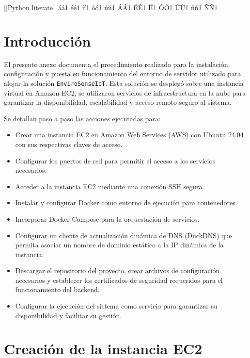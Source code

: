 []{Python}{
literate={á}{{\'a}}1 {é}{{\'e}}1 {í}{{\'i}}1 {ó}{{\'o}}1 {ú}{{\'u}}1
{Á}{{\'A}}1 {É}{{\'E}}1 {Í}{{\'I}}1 {Ó}{{\'O}}1 {Ú}{{\'U}}1
{ñ}{{\~n}}1 {Ñ}{{\~N}}1
}


\section{Introducción}

El presente anexo documenta el procedimiento realizado para la instalación,
configuración y puesta en funcionamiento del entorno de servidor utilizado para
alojar la solución \texttt{EnviroSenseIoT}. Esta solución se desplegó sobre una
instancia virtual en Amazon EC2, se utilizaron servicios de infraestructura en
la nube para garantizar la disponibilidad, escalabilidad y acceso remoto seguro
al sistema.

Se detallan paso a paso las acciones ejecutadas para:
\begin{itemize}
    \item Crear una instancia EC2 en Amazon Web Services (AWS) con Ubuntu 24.04 con sus
          respectivas claves de acceso.
    \item Configurar los puertos de red para permitir el acceso a los servicios
          necesarios.
    \item Acceder a la instancia EC2 mediante una conexión SSH segura.
    \item Instalar y configurar Docker como entorno de ejecución para contenedores.
    \item Incorporar Docker Compose para la orquestación de servicios.
    \item Configurar un cliente de actualización dinámica de DNS (DuckDNS) que permita
          asociar un nombre de dominio estático a la IP dinámica de la instancia.
    \item Descargar el repositorio del proyecto, crear archivos de configuración
          necesarios y establecer los certificados de seguridad requeridos para el
          funcionamiento del backend.
    \item Configurar la ejecución del sistema como servicio para garantizar su
          disponibilidad y facilitar su gestión.
\end{itemize}

\section{Creación de la instancia EC2}

